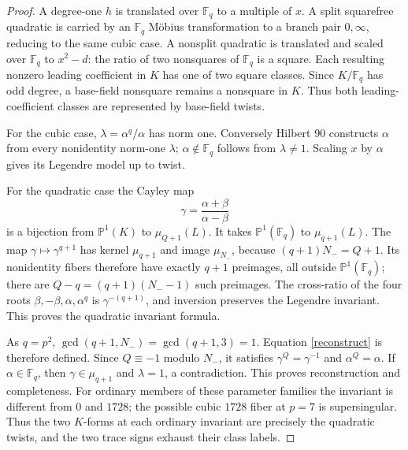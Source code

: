\documentclass[11pt]{article}
\newcommand{\F}{\mathbb F}
\newcommand{\Nm}{N_-}
\begin{document}
\begin{proof}
A degree-one $h$ is translated over $\F_q$ to a multiple of $x$.
A split squarefree quadratic is carried by an $\F_q$ M\"obius transformation
to a branch pair $0,\infty$, reducing to the same cubic case.
A nonsplit quadratic is translated and scaled over $\F_q$ to $x^2-d$:
the ratio of two nonsquares of $\F_q$ is a square. Each resulting nonzero
leading coefficient in $K$ has one of two square classes. Since $K/\F_q$
has odd degree, a base-field nonsquare remains a nonsquare in $K$.
Thus both leading-coefficient classes are represented by base-field twists.

For the cubic case, $\lambda=\alpha^q/\alpha$ has norm one.
Conversely Hilbert 90 constructs $\alpha$ from every nonidentity norm-one
$\lambda$; $\alpha\notin\F_q$ follows from $\lambda\ne1$.
Scaling $x$ by $\alpha$ gives its Legendre model up to twist.

For the quadratic case the Cayley map
\[
 \gamma=\frac{\alpha+\beta}{\alpha-\beta}
\]
is a bijection from $\mathbb P^1(K)$ to $\mu_{Q+1}(L)$.
It takes $\mathbb P^1(\F_q)$ to $\mu_{q+1}(L)$.
The map $\gamma\mapsto\gamma^{q+1}$ has kernel $\mu_{q+1}$ and image
$\mu_{\Nm}$, because $(q+1)\Nm=Q+1$.
Its nonidentity fibers therefore have exactly $q+1$ preimages, all outside
$\mathbb P^1(\F_q)$; there are $Q-q=(q+1)(\Nm-1)$ such preimages.
The cross-ratio of the four roots $\beta,-\beta,\alpha,\alpha^q$
is $\gamma^{-(q+1)}$, and inversion preserves the Legendre invariant.
This proves the quadratic invariant formula.

As $q=p^2$, $\gcd(q+1,\Nm)=\gcd(q+1,3)=1$.
Equation \eqref{reconstruct} is therefore defined. Since $Q\equiv-1$
modulo $\Nm$, it satisfies $\gamma^Q=\gamma^{-1}$ and $\alpha^Q=\alpha$.
If $\alpha\in\F_q$, then $\gamma\in\mu_{q+1}$ and $\lambda=1$,
a contradiction. This proves reconstruction and completeness.
For ordinary members of these parameter families the invariant is different
from $0$ and $1728$; the possible cubic $1728$ fiber at $p=7$ is supersingular.
Thus the two $K$-forms at each ordinary invariant are precisely the quadratic
twists, and the two trace signs exhaust their class labels.
\end{proof}
\end{document}
